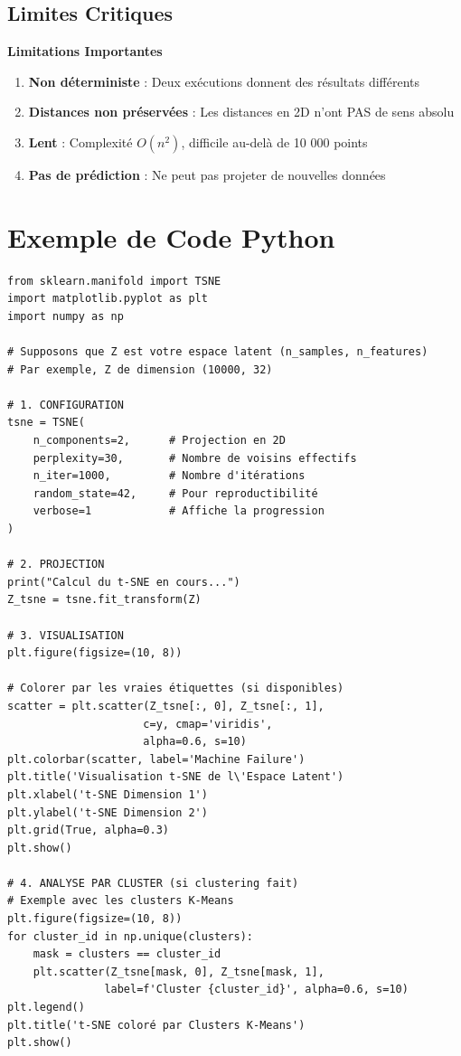 \documentclass[a4paper,11pt]{article}
\begin{document}
\subsection{Limites Critiques}

\begin{warningbox}
\textbf{Limitations Importantes}

\begin{enumerate}
    \item \textbf{Non déterministe} : Deux exécutions donnent des résultats différents
    \item \textbf{Distances non préservées} : Les distances en 2D n'ont PAS de sens absolu
    \item \textbf{Lent} : Complexité $O(n^2)$, difficile au-delà de 10 000 points
    \item \textbf{Pas de prédiction} : Ne peut pas projeter de nouvelles données
\end{enumerate}
\end{warningbox}

\section{Exemple de Code Python}

\begin{codebox}
\begin{lstlisting}
from sklearn.manifold import TSNE
import matplotlib.pyplot as plt
import numpy as np

# Supposons que Z est votre espace latent (n_samples, n_features)
# Par exemple, Z de dimension (10000, 32)

# 1. CONFIGURATION
tsne = TSNE(
    n_components=2,      # Projection en 2D
    perplexity=30,       # Nombre de voisins effectifs
    n_iter=1000,         # Nombre d'itérations
    random_state=42,     # Pour reproductibilité
    verbose=1            # Affiche la progression
)

# 2. PROJECTION
print("Calcul du t-SNE en cours...")
Z_tsne = tsne.fit_transform(Z)

# 3. VISUALISATION
plt.figure(figsize=(10, 8))

# Colorer par les vraies étiquettes (si disponibles)
scatter = plt.scatter(Z_tsne[:, 0], Z_tsne[:, 1], 
                     c=y, cmap='viridis', 
                     alpha=0.6, s=10)
plt.colorbar(scatter, label='Machine Failure')
plt.title('Visualisation t-SNE de l\'Espace Latent')
plt.xlabel('t-SNE Dimension 1')
plt.ylabel('t-SNE Dimension 2')
plt.grid(True, alpha=0.3)
plt.show()

# 4. ANALYSE PAR CLUSTER (si clustering fait)
# Exemple avec les clusters K-Means
plt.figure(figsize=(10, 8))
for cluster_id in np.unique(clusters):
    mask = clusters == cluster_id
    plt.scatter(Z_tsne[mask, 0], Z_tsne[mask, 1], 
               label=f'Cluster {cluster_id}', alpha=0.6, s=10)
plt.legend()
plt.title('t-SNE coloré par Clusters K-Means')
plt.show()
\end{lstlisting}
\end{codebox}
\end{document}
